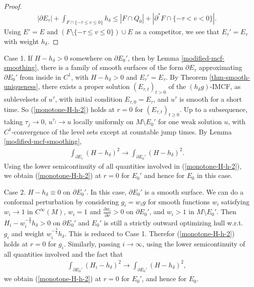 \documentclass[11pt, letterpaper]{amsart}
\theoremstyle{definition}
\theoremstyle{remark}
\begin{document}
\begin{proof}
	\begin{align*}
		|\partial E_{\tau }| + \int_{F \cap \{-\tau \leq v \leq 0\} } h_{\delta } \leq |F \cap Q_0| + |\partial ^* F \cap \{-\tau < v< 0\}| .
	\end{align*} 
	Using $E' = E$ and $(F \setminus \{-\tau \leq v \leq 0\}) \cup E $ as a competitor, we see that $E_{\tau }' = E_{\tau }$ with weight $h_{\delta }$.
\end{proof}

 

Case 1. If $H- h_{\delta }>0$ somewhere on $\partial E_0'$, then by Lemma \ref{modified-mcf-smoothing}, there is a family of smooth surfaces of the form $\partial E_{\tau }$ approximating $\partial E_0'$ from inside in $C^1$, with $H- h_{\delta }>0$ and $E_{\tau }' = E_{\tau }$. By Theorem \ref{thm-smooth-uniqueness}, there exists a proper solution $(E_{\tau ,t})_{t>0}$ of the $(h_{\delta }g)$-IMCF, as sublevelsets of $u^{\tau }$, with initial condition $E _{\tau, 0 } = E_{\tau }$, and $u^{\tau }$ is smooth for a short time. So (\ref{monotone-H-h-2}) holds at $r=0$ for $(E_{\tau ,t})_{t \geq 0}$.
Up to a subsequence, taking $\tau_j \to 0 $,  $u ^{\tau _j} \to u$ locally uniformly on $M \setminus E_0'$ for one weak solution $u$, with $C^1$-convergence of the level sets except at countable jump times. By Lemma \ref{modified-mcf-smoothing},
\begin{align*}
	\int_{\partial E_{\tau }} (H- h_{\delta })^2 \to \int_{\partial E_0'} (H- h_\delta )^2.
\end{align*} 
Using the lower semicontinuity of all quantities involved in (\ref{monotone-H-h-2}), we obtain (\ref{monotone-H-h-2}) at $r=0$ for $E_0'$ and hence for $E_0$ in this case.

Case 2. $H- h_\delta \equiv 0$ on $\partial E_0'$. In this case, $\partial E_0'$ is a smooth surface. We can do a conformal perturbation by considering $g_i = w_i g$ for smooth functions $w_i$ satisfying $w_i \to 1$ in $C^{\infty}(M)$, $w_i =1$ and $\frac{\partial w_i}{\partial \nu } >0$ on $\partial E_0'$, and $w_i>1$ in $M \setminus E_0'$. Then $H_i - w_i ^{-\frac{3}{2}} h_\delta  >0$ on $\partial E_0'$ and $E_0'$ is still a strictly outward optimizing hull w.r.t. $g_i$ and weight $w_i ^{-\frac{3}{2}} h_\delta $. This is reduced to Case 1. Therefor (\ref{monotone-H-h-2}) holds at $r=0$ for $g_i$. Similarly, passing $i\to \infty$, using the lower semicontinuity of all quantities involved and the fact that
\begin{align*}
	\int_{\partial E_0'} (H_i - h_\delta )^2 \to \int_{\partial E_0'} (H - h_\delta )^2,
\end{align*} 
we obtain (\ref{monotone-H-h-2}) at $r=0$ for $E_0'$, and hence for $E_0$. 
\end{document}
